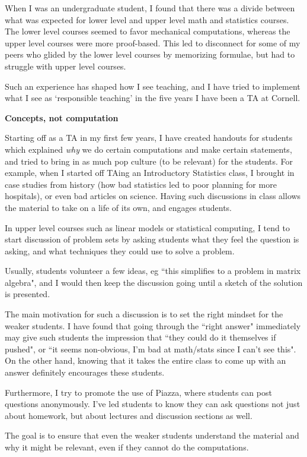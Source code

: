 \documentclass[a4paper,12pt]{article}
\begin{document}
When I was an undergraduate student, I found that there was a divide between what was expected for lower level and upper level math and statistics courses. The lower level courses seemed to favor mechanical computations, whereas the upper level courses were more proof-based. This led to disconnect for some of my peers who glided by the lower level courses by memorizing formulae, but had to struggle with upper level courses.

Such an experience has shaped how I see teaching, and I have tried to implement what I see as `responsible teaching' in the five years I have been a TA at Cornell.

{\bf Concepts, not computation}

Starting off as a TA in my first few years, I have created handouts for students which explained {\it why} we do certain computations and make certain statements, and tried to bring in as much pop culture (to be relevant) for the students. For example, when I started off TAing an Introductory Statistics class, I brought in case studies from history (how bad statistics led to poor planning for more hospitals), or even bad articles on science. Having such discussions in class allows the material to take on a life of its own, and engages students. 

In upper level courses such as linear models or statistical computing, I tend to start discussion of problem sets by asking students what they feel the question is asking, and what techniques they could use to solve a problem. 

Usually, students volunteer a few ideas, eg ``this simplifies to a problem in matrix algebra", and I would then keep the discussion going until a sketch of the solution is presented. 

The main motivation for such a discussion is to set the right mindset for the weaker students. I have found that going through the ``right answer" immediately may give such students the impression that ``they could do it themselves if pushed", or ``it seems non-obvious, I'm bad at math/stats since I can't see this". On the other hand, knowing that it takes the entire class to come up with an answer definitely encourages these students.

Furthermore, I try to promote the use of Piazza, where students can post questions anonymously. I've led students to know they can ask questions not just about homework, but about lectures and discussion sections as well. 

The goal is to ensure that even the weaker students understand the material and why it might be relevant, even if they cannot do the computations.
\end{document}
